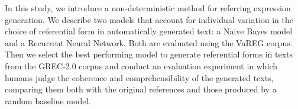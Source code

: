 In this study, we introduce a non-deterministic method for referring expression generation. We describe two models that account for individual variation in the choice of referential form in automatically generated text: a Naive Bayes model and a Recurrent Neural Network. Both are evaluated using the VaREG corpus. Then we select the best performing model to generate referential forms in texts from the GREC-2.0 corpus and conduct an evaluation experiment in which humans judge the coherence and comprehensibility of the generated texts, comparing them both with the original references and those produced by a random baseline model.
